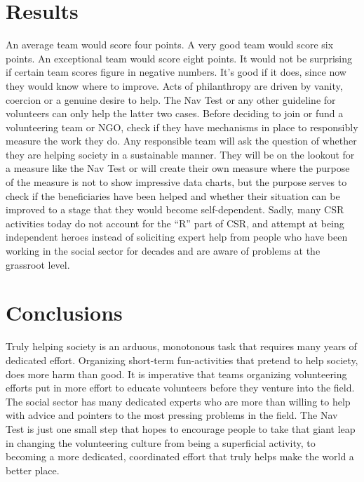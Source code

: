 \documentclass[conference]{IEEEtran}
\begin{document}
\section{Results}
An average team would score four points. A very good team would score six points. An exceptional team would score eight points.
It would not be surprising if certain team scores figure in negative numbers. It's good if it does, since now they would know where to improve. Acts of philanthropy are driven by vanity, coercion or a genuine desire to help. The Nav Test or any other guideline for volunteers can only help the latter two cases. Before deciding to join or fund a volunteering team or NGO, check if they have mechanisms in place to responsibly measure the work they do. Any responsible team will ask the question of whether they are helping society in a sustainable manner. They will be on the lookout for a measure like the Nav Test or will create their own measure where the purpose of the measure is not to show impressive data charts, but the purpose serves to check if the beneficiaries have been helped and whether their situation can be improved to a stage that they would become self-dependent. Sadly, many CSR activities today do not account for the \enquote{R} part of CSR, and attempt at being independent heroes instead of soliciting expert help from people who have been working in the social sector for decades and are aware of problems at the grassroot level. 

\section{Conclusions}
Truly helping society is an arduous, monotonous task that requires many years of dedicated effort. Organizing short-term fun-activities that pretend to help society, does more harm than good. It is imperative that teams organizing volunteering efforts put in more effort to educate volunteers before they venture into the field. The social sector has many dedicated experts who are more than willing to help with advice and pointers to the most pressing problems in the field. The Nav Test is just one small step that hopes to encourage people to take that giant leap in changing the volunteering culture from being a superficial activity, to becoming a more dedicated, coordinated effort that truly helps make the world a better place.
\end{document}
